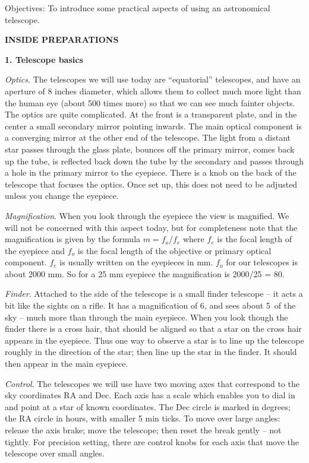 
\noindent
{Objectives:} To introduce some practical aspects of using an astronomical telescope.

\bigskip\noindent
{\bf INSIDE PREPARATIONS}


\medskip
\bigskip
\noindent
{\bf 1. Telescope basics}

\medskip
\noindent
\emph{Optics}. The telescopes we will use today are ``equatorial''
telescopes, and have an aperture of 8 inches diameter, which allows
them to collect much more light than the human eye (about 500 times
more) so that we can see much fainter objects.  The optics are quite
complicated. At the front is a transparent plate, and in the center a
small secondary mirror pointing inwards. The main optical component is
a converging mirror at the other end of the telescope. The light from
a distant star passes through the glass plate, bounces off the primary
mirror, comes back up the tube, is reflected back down the tube by the
secondary and passes through a hole in the primary mirror to the
eyepiece.  There is a knob on the back of the telescope that focuses
the optics. Once set up, this does not need to be adjusted unless you
change the eyepiece.

\medskip \noindent
\emph{Magnification}. When you look through the eyepiece the
view is magnified. We will not be concerned with this aspect today,
but for completeness note that the magnification is given by
the formula $m = f_o/f_e$ where $f_e$ is the focal length of the
eyepiece and $f_o$ is the focal length of the objective or primary
optical component. $f_e$ is usually written on the eyepieces in
mm. $f_o$ for our telescopes is about 2000 mm. So for a 25 mm
eyepiece the magnification is 2000/25 = 80.

\medskip \noindent 
\emph{Finder}. Attached to the side of the telescope is a
small finder telescope -- it acts a
bit like the sights on a rifle. It has a magnification of 6, and
sees about 5\deg\ of the sky -- much more than through the main
eyepiece. When you look though the finder there is a cross hair, that should
be aligned so that a star on the cross hair appears in the
eyepiece. Thus one way to observe a star is to line up the telescope
roughly in the direction of the star; then line up the star in the
finder. It should then appear in the main eyepiece.

\medskip \noindent 
\emph{Control}. The telescopes we will use have two moving axes that
correspond to the sky coordinates RA and Dec. Each axis has a scale
which enables you to dial in and point at a star of known
coordinates. The Dec circle is marked in degrees; the RA circle in
hours, with smaller 5 min ticks. To move over large angles: release
the axis brake; move the telescope; then reset the break gently -- not
tightly. For precision setting, there are control knobs for each axis
that move the telescope over small angles. 

